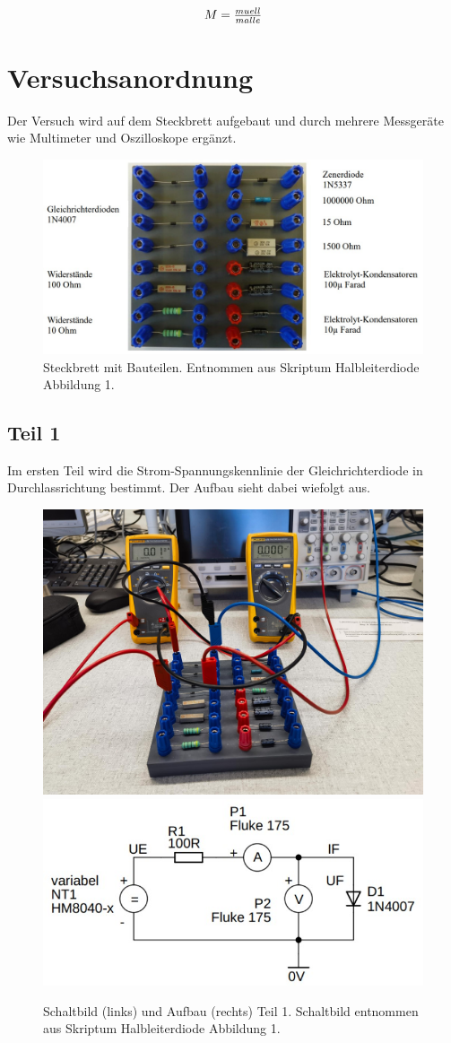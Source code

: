 \documentclass[12pt,a4paper,twoside]{article}
\begin{document}
\begin{equation}
    \label{eq:Müll}
    \centerline{$M=\frac{muell}{malle}$}
\end{equation}

\section{Versuchsanordnung} %
Der Versuch wird auf dem Steckbrett aufgebaut und durch mehrere Messgeräte wie Multimeter und Oszilloskope ergänzt. 

\begin{figure}[H]
    \centering
    \includegraphics[width=0.6\linewidth]{nudes/steckbrett.jpg}
    \caption{Steckbrett mit Bauteilen. Entnommen aus Skriptum Halbleiterdiode Abbildung 1. \cite{teachcenter2}}
    \label{fig:Steckbrett}
\end{figure}

\subsection{Teil 1}
Im ersten Teil wird die Strom-Spannungskennlinie der Gleichrichterdiode in Durchlassrichtung bestimmt. Der Aufbau sieht dabei wiefolgt aus. 

\begin{figure}[H]
    \centering
    \includegraphics[width=0.4\linewidth]{nudes/1a.jpg}
    \includegraphics[width=0.4\linewidth]{nudes/aufbau1a schaltplan.jpg}
    \caption{Schaltbild (links) und Aufbau (rechts) Teil 1. Schaltbild entnommen aus Skriptum Halbleiterdiode Abbildung 1. \cite{teachcenter2}}
    \label{fig:aufbau 1a}
\end{figure}
\end{document}
